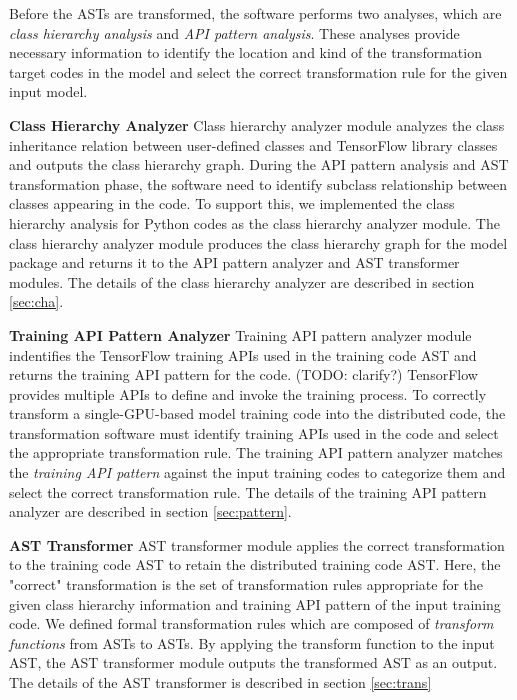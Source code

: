 Before the ASTs are transformed, the software performs two analyses, 
which are \textit{class hierarchy analysis} and 
\textit{API pattern analysis}.
These analyses provide necessary information to identify the
location and kind of the transformation target codes in the model
and select the correct transformation rule for the given input model.

\textbf{Class Hierarchy Analyzer}
Class hierarchy analyzer module analyzes the class inheritance relation
between user-defined classes and TensorFlow library classes and
outputs the class hierarchy graph.
During the API pattern analysis and AST transformation phase,
the software need to identify subclass relationship between
classes appearing in the code.
To support this, we implemented the class hierarchy analysis
for Python codes as the class hierarchy analyzer module.
The class hierarchy analyzer module produces the class hierarchy graph
for the model package and returns it to the API pattern analyzer and 
AST transformer modules. The details of the class hierarchy analyzer are
described in section \ref{sec:cha}.

\textbf{Training API Pattern Analyzer}
Training API pattern analyzer module 
indentifies the TensorFlow training APIs used in the training code AST
and returns the training API pattern for the code. (TODO: clarify?)
TensorFlow provides multiple APIs to define and invoke the training process.
To correctly transform a single-GPU-based model training code into
the distributed code, the transformation software must identify
training APIs used in the code and select the appropriate transformation rule.
The training API pattern analyzer matches the \textit{training API pattern}
against the input training codes to categorize them and select
the correct transformation rule. The details of the training API pattern
analyzer are described in section \ref{sec:pattern}.

\textbf{AST Transformer}
AST transformer module applies the correct transformation to the
training code AST to retain the distributed training code AST.
Here, the "correct" transformation is the set of transformation rules
appropriate for the given class hierarchy information and
training API pattern of the input training code.
We defined formal transformation rules which are composed of
\textit{transform functions} from ASTs to ASTs.
By applying the transform function to the input AST,
the AST transformer module outputs the transformed AST as an output.
The details of the AST transformer is described in section \ref{sec:trans}
